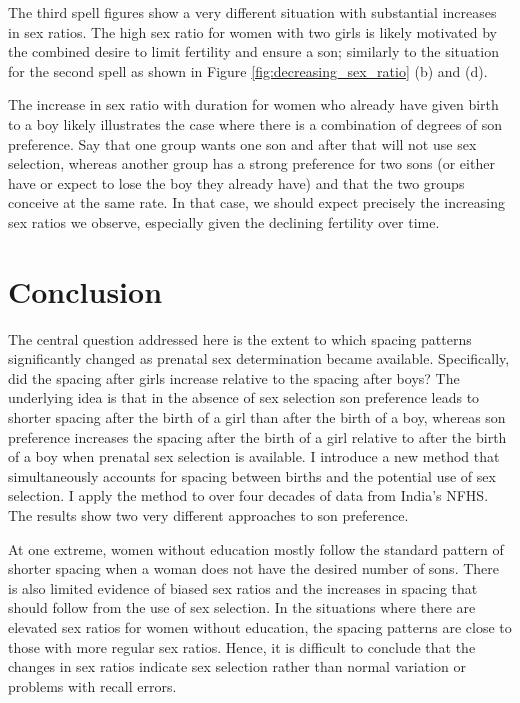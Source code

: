 \documentclass[12pt,letterpaper]{article}
\begin{document}
The third spell figures show a very different situation with substantial 
increases in sex ratios.
The high sex ratio for women with two girls is likely 
motivated by the combined desire to limit fertility and ensure a son;
similarly to the situation for the second spell as shown in 
Figure \ref{fig:decreasing_sex_ratio} (b) and (d).

The increase in sex ratio with duration for women who already have
given birth to a boy likely illustrates the case where there is a
combination of degrees of son preference.
Say that one group wants one son and after that will not use sex
selection, whereas another group has a strong preference for two
sons (or either have or expect to lose the boy they already have)
and that the two groups conceive at the same rate.
In that case, we should expect precisely the increasing sex ratios
we observe, especially given the declining fertility over time.


\section{Conclusion\label{sec:conclusion}}


The central question addressed here is the extent to which spacing patterns 
significantly changed as prenatal sex determination became available.
Specifically, did the spacing after girls increase relative to the spacing
after boys?
The underlying idea is that in the absence of sex selection son 
preference leads to shorter spacing after the birth of a girl than after the 
birth of a boy, whereas son preference increases the spacing after the birth 
of a girl relative to after the birth of a boy when prenatal sex selection is 
available.
I introduce a new method that simultaneously accounts for spacing
between births and the potential use of sex selection. 
I apply the method to over four decades of data from India's NFHS.
The results show two very different approaches to son preference.

At one extreme, women without education mostly follow the standard 
pattern of shorter spacing when a woman does not have the desired number of 
sons.
There is also limited evidence of biased sex ratios and the increases in
spacing that should follow from the use of sex selection.
 In the situations where there are elevated sex ratios for women without
education, the spacing patterns are close to those with more regular sex
ratios. 
Hence, it is difficult to conclude that the changes in sex
ratios indicate sex selection rather than normal variation or problems
with recall errors.
\end{document}
